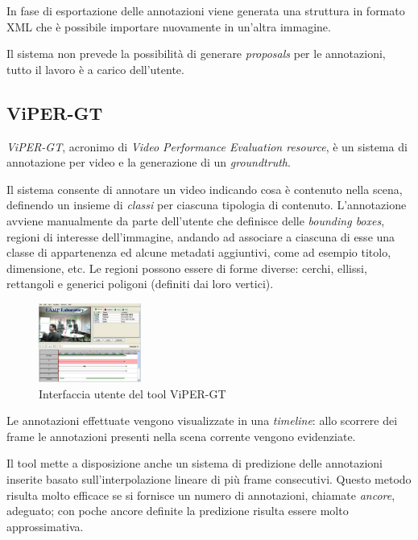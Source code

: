 In fase di esportazione delle annotazioni viene generata una struttura in formato XML che è possibile importare nuovamente in un'altra immagine.

Il sistema non prevede la possibilità di generare \emph{proposals} per le annotazioni, tutto il lavoro è a carico dell'utente.

\subsection{ViPER-GT}

\emph{ViPER-GT}\cite{Vondrick:2013:ESU:2436010.2436013}, acronimo di \emph{Video Performance Evaluation resource}, è un sistema di annotazione per video e la generazione di un \emph{groundtruth}. 

Il sistema consente di annotare un video indicando cosa è contenuto nella scena, definendo un insieme di \emph{classi} per ciascuna tipologia di contenuto. L'annotazione avviene manualmente da parte dell'utente che definisce delle \emph{bounding boxes}, regioni di interesse dell'immagine, andando ad associare a ciascuna di esse una classe di appartenenza ed alcune metadati aggiuntivi, come ad esempio titolo, dimensione, etc. Le regioni possono essere di forme diverse: cerchi, ellissi, rettangoli e generici poligoni (definiti dai loro vertici).

\begin{figure}[h]
\begin{center}
\includegraphics[width=0.3\textwidth]{images/vipergt.jpg}
\end{center}
  \caption{Interfaccia utente del tool ViPER-GT}
\label{fig:vipergt}
\end{figure}


Le annotazioni effettuate vengono visualizzate in una \emph{timeline}: allo scorrere dei frame le annotazioni presenti nella scena corrente vengono evidenziate.

Il tool mette a disposizione anche un sistema di predizione delle annotazioni inserite basato sull'interpolazione lineare di più frame consecutivi. Questo metodo risulta molto efficace se si fornisce un numero di annotazioni, chiamate \emph{ancore}, adeguato; con poche ancore definite la predizione risulta essere molto approssimativa.

